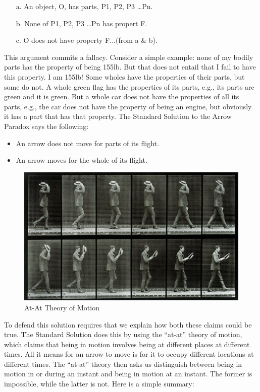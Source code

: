 \documentclass[oneside]{article}
\begin{document}
\begin{enumerate}
\item[a.] An object, O, has parts, P1, P2, P3 \ldots{Pn}.
\item[b.] None of P1, P2, P3 \ldots{Pn} has propert F. 
\item[c.] O does not have property F...(from a \& b). 
\end{enumerate}
This argument commits a fallacy. Consider a simple example: none of my bodily parts has the property of being 155lb. But that does not entail that I fail to have this property. I am 155lb! Some wholes have the properties of their parts, but some do not. A whole green flag has the properties of its parts, e.g., its parts are green and it is green. But a whole car does not have the properties of all its parts, e.g., the car does not have the property of being an engine, but obviously it has a part that has that property. The Standard Solution to the Arrow Paradox says the following: 
\begin{itemize}
\item An arrow does not move for parts of its flight. 
\item An arrow moves for the whole of its flight. 
\end{itemize}
\begin{figure}[h]
  \includegraphics[width=\linewidth]{motion.jpg}
  \caption{At-At Theory of Motion}
\end{figure}
To defend this solution requires that we explain how both these claims could be true. The Standard Solution does this by using  the ``at-at'' theory of motion, which claims that being in motion involves being at different places at different times. All it means for an arrow to move is for it to occupy different locations at different times. The ``at-at'' theory then asks us distinguish between being in motion in or during an instant and   being in motion at an instant. The former is impossible, while the latter is not. Here is a simple summary: 
\end{document}
